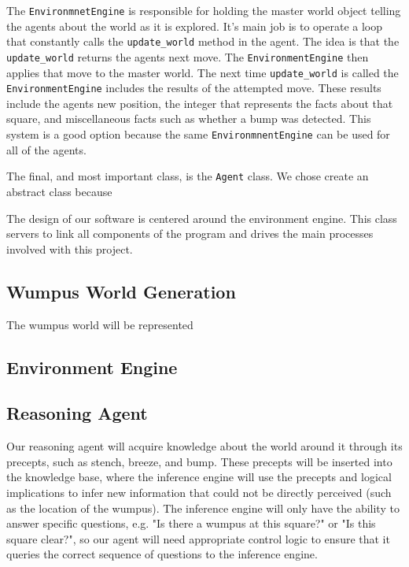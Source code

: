 \documentclass{article}
\begin{document}
		The \texttt{EnvironmnetEngine} is responsible for holding the master world object telling the agents about the world as it is explored.
		It's main job is to operate a loop that constantly calls the \texttt{update\_world} method in the agent. 
		The idea is that the \texttt{update\_world} returns the agents next move. 
		The \texttt{EnvironmentEngine} then applies that move to the master world.
		The next time \texttt{update\_world} is called the \texttt{EnvironmentEngine} includes the results of the attempted move.
		These results include the agents new position, the integer that represents the facts about that square, and miscellaneous facts such as whether a bump was detected. 
		This system is a good option because the same \texttt{EnvironmnentEngine} can be used for all of the agents. 
		
		The final, and most important class, is the \texttt{Agent} class. We chose create an abstract class because 
		   
		
	
		The design of our software is centered around the environment engine. 
		This class servers to link all components of the program and drives the main processes involved with this project. 
		

		
		\subsection{Wumpus World Generation}
		
			The wumpus world will be represented 
		
		\subsection{Environment Engine}
		
		\subsection{Reasoning Agent}
		
			Our reasoning agent will acquire knowledge about the world around it through its precepts, such as stench, breeze, and bump. These precepts will be inserted into the knowledge base, where the inference engine will use the precepts and logical implications to infer new information that could not be directly perceived (such as the location of the wumpus). The inference engine will only have the ability to answer specific questions, e.g. "Is there a wumpus at this square?" or "Is this square clear?", so our agent will need appropriate control logic to ensure that it queries the correct sequence of questions to the inference engine.  
		
\end{document}
